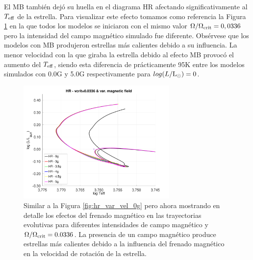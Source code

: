 El MB también dejó su huella en el diagrama HR afectando significativamente al $T_{\mathrm{eff}}$ de la estrella. Para visualizar este efecto tomamos como referencia la Figura \ref{hr_vc_0336_var_g_z1} en la que todos los modelos se iniciaron con el mismo valor $\Omega / \Omega_{\mathrm{crit}}=0,0336$ pero la intensidad del campo magnético simulado fue diferente. Obsérvese que los modelos con MB produjeron estrellas más calientes debido a su influencia. La menor velocidad con la que giraba la estrella debido al efecto MB provocó el aumento del $T_{\mathrm{eff}}$, siendo esta diferencia de prácticamente 95K entre los modelos simulados con 0.0G y 5.0G respectivamente para $log(L/\mathrm{L}_\odot)=0$.

\begin{figure}
    \centering
    \includegraphics[width=0.7\textwidth]{img/paper1/hr_vc_0336_var_g_z1.pdf}
	\caption{Similar a la Figura \ref{fig:hr_var_vel_0g} pero ahora mostrando en detalle los efectos del frenado magnético en las trayectorias evolutivas para diferentes intensidades de campo magnético y $\Omega / \Omega_{\mathrm{crit}}=0.0336$. La presencia de un campo magnético produce estrellas más calientes debido a la influencia del frenado magnético en la velocidad de rotación de la estrella.}
	\label{hr_vc_0336_var_g_z1}
\end{figure}

